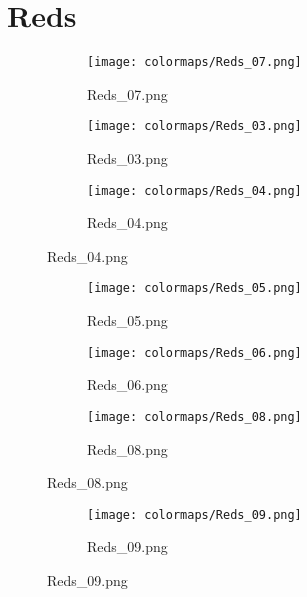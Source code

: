 \documentclass{article}%
\begin{document}
%
\newpage%
\section{Reds}%
\label{sec:Reds}%
\hspace{1cm}\hfill%
\hspace{1cm}\hfill%
\hspace{1cm}\hfill%


\begin{figure}[h!]%
\begin{subfigure}[b]{0.3\linewidth}%
\texttt{[image: colormaps/Reds\_07.png]}%
\caption{Reds\_07.png}%
\end{subfigure}%
\begin{subfigure}[b]{0.3\linewidth}%
\texttt{[image: colormaps/Reds\_03.png]}%
\caption{Reds\_03.png}%
\end{subfigure}%
\begin{subfigure}[b]{0.3\linewidth}%
\texttt{[image: colormaps/Reds\_04.png]}%
\caption{Reds\_04.png}%
\end{subfigure}%
\end{figure}

%
\hspace{1cm}\hfill%
\hspace{1cm}\hfill%
\hspace{1cm}\hfill%


\begin{figure}[h!]%
\begin{subfigure}[b]{0.3\linewidth}%
\texttt{[image: colormaps/Reds\_05.png]}%
\caption{Reds\_05.png}%
\end{subfigure}%
\begin{subfigure}[b]{0.3\linewidth}%
\texttt{[image: colormaps/Reds\_06.png]}%
\caption{Reds\_06.png}%
\end{subfigure}%
\begin{subfigure}[b]{0.3\linewidth}%
\texttt{[image: colormaps/Reds\_08.png]}%
\caption{Reds\_08.png}%
\end{subfigure}%
\end{figure}

%
\hspace{1cm}\hfill%


\begin{figure}[h!]%
\begin{subfigure}[b]{0.3\linewidth}%
\texttt{[image: colormaps/Reds\_09.png]}%
\caption{Reds\_09.png}%
\end{subfigure}%
\end{figure}
\end{document}
